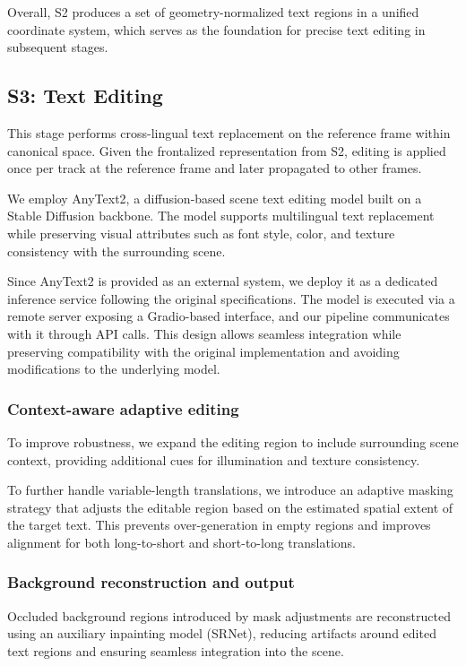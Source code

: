 Overall, S2 produces a set of geometry-normalized text regions in a unified coordinate system, which serves as the foundation for precise text editing in subsequent stages.

\subsection{S3: Text Editing}

This stage performs cross-lingual text replacement on the reference frame within canonical space. Given the frontalized representation from S2, editing is applied once per track at the reference frame and later propagated to other frames.

We employ AnyText2, a diffusion-based scene text editing model built on a Stable Diffusion backbone. The model supports multilingual text replacement while preserving visual attributes such as font style, color, and texture consistency with the surrounding scene.

Since AnyText2 is provided as an external system, we deploy it as a dedicated inference service following the original specifications. The model is executed via a remote server exposing a Gradio-based interface, and our pipeline communicates with it through API calls. This design allows seamless integration while preserving compatibility with the original implementation and avoiding modifications to the underlying model.

\subsubsection{Context-aware adaptive editing}

To improve robustness, we expand the editing region to include surrounding scene context, providing additional cues for illumination and texture consistency. 

To further handle variable-length translations, we introduce an adaptive masking strategy that adjusts the editable region based on the estimated spatial extent of the target text. This prevents over-generation in empty regions and improves alignment for both long-to-short and short-to-long translations.

\subsubsection{Background reconstruction and output}

Occluded background regions introduced by mask adjustments are reconstructed using an auxiliary inpainting model (SRNet), reducing artifacts around edited text regions and ensuring seamless integration into the scene.

